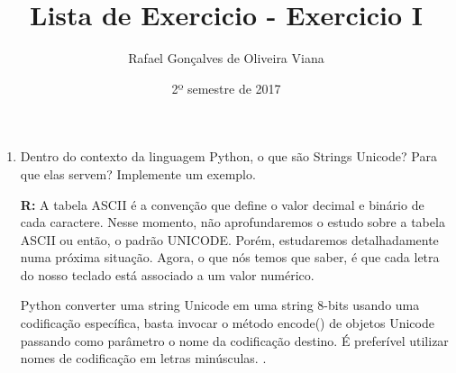 \documentclass[12pt]{article}
\title{Lista de Exercicio  - Exercicio I }
\author{Rafael Gonçalves de  Oliveira Viana}
\date{2º semestre de 2017}
\begin{document}
\maketitle

\begin{enumerate}
\item
Dentro do contexto da linguagem Python, o que são Strings Unicode? Para que elas
servem? Implemente um exemplo.

\textbf{R: }
A tabela ASCII é a convenção que define o valor decimal e binário de cada caractere. Nesse momento, não aprofundaremos o estudo sobre a tabela ASCII ou então, o padrão UNICODE. Porém, estudaremos detalhadamente numa próxima situação. Agora, o que nós temos que saber, é que cada letra do nosso teclado está associado a um valor numérico.

Python converter uma string Unicode em uma string 8-bits usando uma codificação específica, basta invocar o método encode() de objetos Unicode passando como parâmetro o nome da codificação destino. É preferível utilizar nomes de codificação em letras minúsculas.
.




\end{enumerate}
\end{document}
